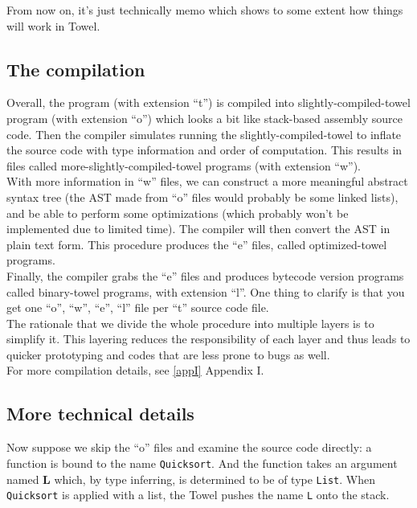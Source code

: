 \documentclass{article}
\begin{document}
From now on, it's just technically memo which shows to some extent how things will work in Towel.

\subsection{The compilation}

Overall, the program (with extension ``t'') is compiled into slightly-compiled-towel program (with extension ``o'') which looks a bit like stack-based assembly source code. Then the compiler simulates running the slightly-compiled-towel to inflate the source code with type information and order of computation. This results in files called more-slightly-compiled-towel programs (with extension ``w'').\\

With more information in ``w'' files, we can construct a more meaningful abstract syntax tree (the AST made from ``o'' files would probably be some linked lists), and be able to perform some optimizations (which probably won't be implemented due to limited time). The compiler will then convert the AST in plain text form. This procedure produces the ``e'' files, called optimized-towel programs.\\

Finally, the compiler grabs the ``e'' files and produces bytecode version programs called binary-towel programs, with extension ``l''. One thing to clarify is that you get one ``o'', ``w'', ``e'', ``l'' file per ``t'' source code file.\\

The rationale that we divide the whole procedure into multiple layers is to simplify it. This layering reduces the responsibility of each layer and thus leads to quicker prototyping and codes that are less prone to bugs as well.\\

For more compilation details, see \ref{appI} Appendix I.

\subsection{More technical details}

Now suppose we skip the ``o'' files and examine the source code directly: a function is bound to the name \texttt{Quicksort}. And the function takes an argument named \textbf{L} which, by type inferring, is determined to be of type \texttt{List}. When \texttt{Quicksort} is applied with a list, the Towel pushes the name \texttt{L} onto the stack.\\
\end{document}

